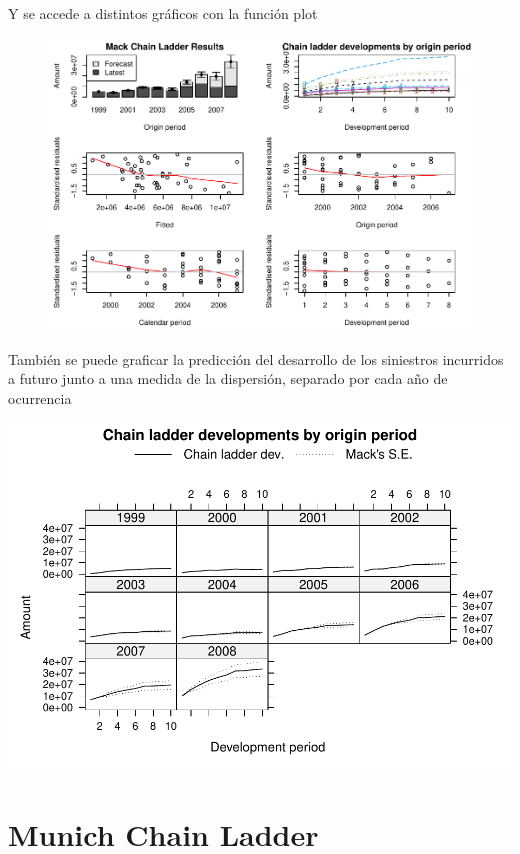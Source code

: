 \documentclass[
  12pt,
]{article}
\begin{document}
Y se accede a distintos gráficos con la función plot

\begin{figure}
\includegraphics[width=1\linewidth]{informe_files/figure-latex/unnamed-chunk-17-1} \end{figure}

También se puede graficar la predicción del desarrollo de los siniestros
incurridos a futuro junto a una medida de la dispersión, separado por
cada año de ocurrencia

\includegraphics{informe_files/figure-latex/unnamed-chunk-18-1.pdf}

\hypertarget{munich-chain-ladder}{%
\section{Munich Chain Ladder}\label{munich-chain-ladder}}
\end{document}
